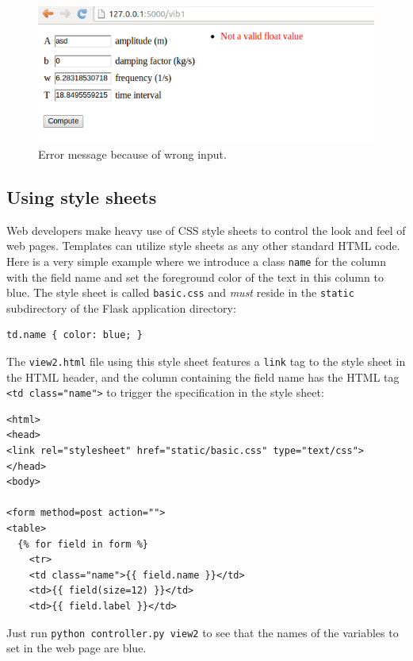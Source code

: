 \documentclass[%
oneside,                 %
final,                   %
10pt]{article}
\begin{document}
\begin{figure}[ht]
  \centerline{\includegraphics[width=0.9\linewidth]{fig-web4sa/vib1_flask_error1.png}}
  \caption{
  Error message because of wrong input. \label{wf:vib1:flask:fig:error1}
  }
\end{figure}


\subsection{Using style sheets}


Web developers make heavy use of CSS style sheets to control the look
and feel of web pages. Templates can utilize style sheets as any other
standard HTML code. Here is a very simple example where we introduce
a class \Verb!name! for the column with the field name and set the
foreground color of the text in this column to blue.
The style sheet is called \Verb!basic.css! and \emph{must} reside in the
\Verb!static! subdirectory of the Flask application directory:

\begin{Verbatim}[numbers=none,fontsize=\fontsize{9pt}{9pt},baselinestretch=0.85]
td.name { color: blue; }
\end{Verbatim}
The \Verb!view2.html! file using this style sheet features a \Verb!link! tag
to the style sheet in the HTML header, and the column containing
the field name has
the HTML tag \Verb!<td class="name">! to trigger the specification in
the style sheet:

\begin{Verbatim}[numbers=none,fontsize=\fontsize{9pt}{9pt},baselinestretch=0.85]
<html>
<head>
<link rel="stylesheet" href="static/basic.css" type="text/css">
</head>
<body>

<form method=post action="">
<table>
  {% for field in form %}
    <tr>
    <td class="name">{{ field.name }}</td>
    <td>{{ field(size=12) }}</td>
    <td>{{ field.label }}</td>
\end{Verbatim}
Just run \Verb!python controller.py view2! to see that the names
of the variables to set in the web page are blue.
\end{document}
